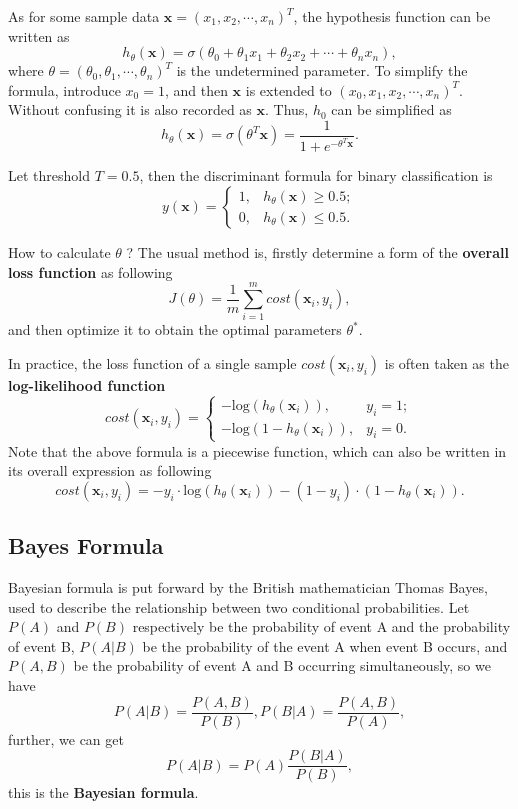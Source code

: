 As for some sample data $\mathbf{x} = (x_1,x_2,\cdots,x_n)^T$, the hypothesis function can be written as
$$h_\theta(\mathbf{x}) = \sigma(\theta_0+\theta_1 x_1+\theta_2 x_2+\cdots+\theta_n x_n),$$
where $\theta = (\theta_0,\theta_1,\cdots,\theta_n)^T$ is the undetermined parameter. To simplify the formula, introduce $x_0 = 1$, and then $\mathbf{x}$ is extended to $(x_0,x_1,x_2,\cdots,x_n)^T$. Without confusing it is also recorded as $\mathbf{x}$. Thus, $h_0$ can be simplified as 
$$h_\theta(\mathbf{x}) = \sigma(\theta^T \mathbf{x}) = \frac{1}{1+e^{-\theta^T \mathbf{x}}}.$$

Let threshold $T = 0.5$, then the discriminant formula for binary classification is
$$y(\mathbf{x})=
\begin{cases}
1,& h_\theta(\mathbf{x})\geq 0.5;\\
0,& h_\theta(\mathbf{x})\le 0.5.
\end{cases}$$

How to calculate $\theta$ ? The usual method is, firstly determine a form of the \textbf{overall loss function} as following
$$ J(\theta) = \frac{1}{m}\sum^m_{i=1}cost(\mathbf{x}_i,y_i),$$
and then optimize it to obtain the optimal parameters $\theta^*$.

In practice, the loss function of a single sample $cost(\mathbf{x}_i,y_i)$ is often taken as the \textbf{log-likelihood function}
$$cost(\mathbf{x}_i,y_i)=
\begin{cases}
-\mathrm{log}(h_\theta(\mathbf{x}_i)),& y_i=1;\\
-\mathrm{log}(1-h_\theta(\mathbf{x}_i)),& y_i=0.
\end{cases}$$
Note that the above formula is a piecewise function, which can also be written in its overall expression as following
$$cost(\mathbf{x}_i,y_i) = -y_i\cdot\mathrm{log}(h_\theta(\mathbf{x}_i))-(1-y_i)\cdot(1-h_\theta(\mathbf{x}_i)).$$

\subsection{Bayes Formula}
Bayesian formula is put forward by the British mathematician Thomas Bayes, used to describe the relationship between two conditional probabilities. Let $P(A)$ and $P(B)$ respectively be the probability of event A and the probability of event B, $P(A|B)$ be the probability of the event A when event B occurs, and $P(A,B)$ be the probability of event A and B occurring simultaneously, so we have
$$P(A|B)=\frac{P(A,B)}{P(B)}, P(B|A)=\frac{P(A,B)}{P(A)}, $$
further, we can get
$$P(A|B)=P(A)\frac{P(B|A)}{P(B)},$$
this is the \textbf{Bayesian formula}.

